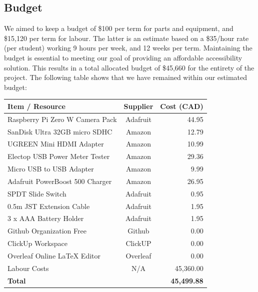 \documentclass[a4paper,11pt]{article}
\begin{document}
\subsection{Budget}
We aimed to keep a budget of \$100 per term for parts and equipment, and \$15,120 per term for labour. The latter is an estimate based on a \$35/hour rate (per student) working 9 hours per week, and 12 weeks per term. Maintaining the budget is essential to meeting our goal of providing an affordable accessibility solution. This results in a total allocated budget of \$45,660 for the entirety of the project. The following table shows that we have remained within our estimated budget:

\begin{table}[ht]
    \centering
    \begin{tabular}{|l|c|r|}
        \hline
        
        \textbf{Item / Resource} & \textbf{Supplier} & \textbf{Cost (CAD)}
        \\ \hline
        Raspberry Pi Zero W Camera Pack & Adafruit      & 44.95
        \\ \hline
        SanDisk Ultra 32GB micro SDHC   & Amazon        & 12.79
        \\ \hline
        UGREEN Mini HDMI Adapter        & Amazon        & 10.99
        \\ \hline
        Electop USB Power Meter Tester  & Amazon        & 29.36
        \\ \hline
        Micro USB to USB Adapter        & Amazon        & 9.99
        \\ \hline
        Adafruit PowerBoost 500 Charger & Amazon        & 26.95
        \\ \hline
        SPDT Slide Switch               & Adafruit      & 0.95
        \\ \hline
        0.5m JST Extension Cable        & Adafruit      & 1.95
        \\ \hline
        3 x AAA Battery Holder          & Adafruit      & 1.95
        \\ \hline
        Github Organization Free        & Github        & 0.00
        \\ \hline
        ClickUp Workspace               & ClickUP       & 0.00
        \\ \hline
        Overleaf Online LaTeX Editor    & Overleaf      & 0.00
        \\ \hline
        Labour Costs                    & N/A           & 45,360.00
        \\ \hline
        \textbf{Total}                  & \multicolumn{2}{r|}{\textbf{45,499.88}}
        \\ \hline
    \end{tabular}
    \label{Tab:budget}
\end{table}
\end{document}
